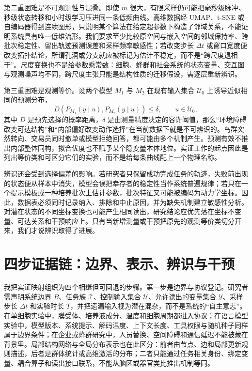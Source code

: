 第二重困难是不可观测性与混叠。即使 $m$ 很大，有限采样仍可能把毫秒级脉冲、秒级状态转移和小时级学习压进同一条低频曲线。高维数据经 UMAP、t-SNE 或自编码器得到连续图形，只说明某个算法在给定超参数下构造了邻域关系，不能证明系统具有唯一低维流形。我们要求至少比较原空间与嵌入空间的邻域保持率、跨批次稳定性、留出轨迹预测误差和采样频率敏感性；若改变步长 $\Delta t$ 或窗口宽度便改变拓扑结论，所谓孔洞或分支就应被标记为估计不稳定，而不是“跨尺度退相干”。尺度变换也不是给参数乘常数：细胞、蜂群和社会系统的状态变量、交互图与观测噪声均不同，跨尺度主张只能是结构性质的迁移假设，需逐层重新辨识。

第三重困难是观测等价。设两个模型 $M_1$ 与 $M_2$ 在现有输入集合 $\mathcal U_0$ 上诱导近似相同的预测分布，
\begin{equation}
 D\!\left(P_{M_1}(y\mid u),P_{M_2}(y\mid u)\right)\leq\delta,
 \qquad u\in\mathcal U_0,
\end{equation}
其中 $D$ 是预先选择的概率距离，$\delta$ 是由测量精度决定的容许阈值，那么“环境障碍改变可达结构”和“内部偏好改变动作选择”在当前数据下就是不可辨识的。鸟群突然转向、交易员同时撤单或模型拒绝回答，都可能由多个机制产生。预测有效不推出内部整体同构，拟合优度也不赋予某个隐变量本体地位。实证工作的起点因此是列出等价类和可区分它们的实验，而不是给每条曲线配上一个物理名称。

辨识还会受到选择偏差的影响。若研究者只保留成功完成任务的轨迹，失败前出现的状态便从样本中消失，模型会误把幸存者的稳定性当作系统普遍规律；若只在一个提示模板或一种培养批次上估计参数，批次特征又可能被编码为动力学坐标。因此，数据表必须同时记录纳入、排除和中止原因，并为缺失机制建立敏感性分析。对潜在状态的不同坐标变换也可能产生相同读出，研究结论应优先落在坐标不变量、可达关系和干预响应上。只有当新增测量或干预把原先的观测等价类切分开来，我们才说辨识取得了进展。

\section{四步证据链：边界、表示、辨识与干预}
\label{sec:four_step_empirical_framework}

我把实证映射组织为四个相继但可回退的步骤。第一步是边界与协议登记。研究者需声明系统边界 $B$、任务族 $\mathcal T$、控制输入集合 $\mathcal U$、允许读出的变量集合 $\mathcal Y$、采样步长 $\Delta t$ 和实验时长 $T$，并把遗漏输入视为潜在混杂，而不是系统的“自主意志”。在单细胞实验中，膜受体、培养液成分、温度和细胞周期都进入协议；在语言模型实验中，模型版本、系统提示、解码温度、上下文长度、工具权限与随机种子同样属于边界条件；在企业或蜂群研究中，人员替换、空间障碍和通信延迟不能被藏在背景里。局部结构网络与全局分布表示也在此区分：前者由节点、边和局部更新规则描述，后者是群体统计或高维激活的分布；二者只能通过任务相关身份、绑定变量、耦合算子和读出接口联系，不能从脑区或器官类比推出机制等同。

